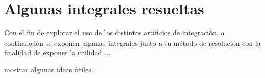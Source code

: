 \section{Algunas integrales resueltas}
Con el fin de explorar el uso de los distintos artificios de integración, a continuación se exponen algunas integrales junto a su método de resolución con la finalidad de exponer la utilidad ...

mostrar algunas ideas útiles...